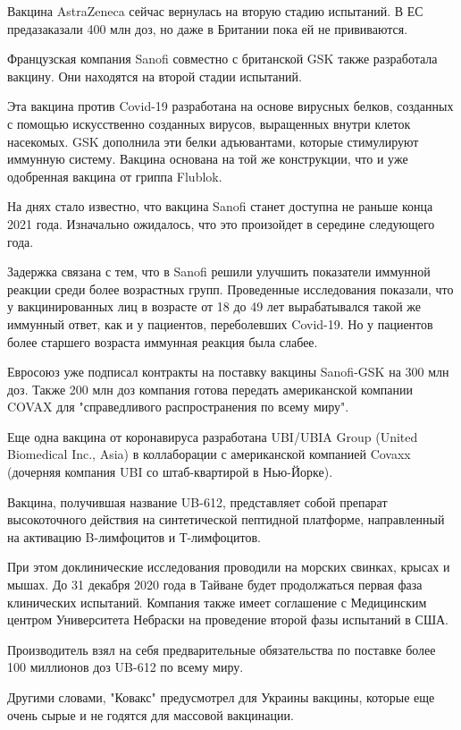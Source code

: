 Вакцина AstraZeneca сейчас вернулась на вторую стадию испытаний. В ЕС
предазаказали 400 млн доз, но даже в Британии пока ей не прививаются.

Французская компания Sanofi совместно с британской GSK также разработала
вакцину. Они находятся на второй стадии испытаний.

Эта вакцина против Covid-19 разработана на основе вирусных белков, созданных с
помощью искусственно созданных вирусов, выращенных внутри клеток насекомых. GSK
дополнила эти белки адъювантами, которые стимулируют иммунную систему. Вакцина
основана на той же конструкции, что и уже одобренная вакцина от гриппа Flublok.

На днях стало известно, что вакцина Sanofi станет доступна не раньше конца 2021
года. Изначально ожидалось, что это произойдет в середине следующего года.

Задержка связана с тем, что в Sanofi решили улучшить показатели иммунной
реакции среди более возрастных групп. Проведенные исследования показали, что у
вакцинированных лиц в возрасте от 18 до 49 лет вырабатывался такой же иммунный
ответ, как и у пациентов, переболевших Covid-19. Но у пациентов более старшего
возраста иммунная реакция была слабее. 

Евросоюз уже подписал контракты на поставку вакцины Sanofi-GSK на 300 млн доз.
Также 200 млн доз компания готова передать американской компании COVAX для
"справедливого распространения по всему миру".

Еще одна вакцина от коронавируса разработана UBI/UBIA Group (United Biomedical
Inc., Asia) в коллаборации с американской компанией Covaxx (дочерняя компания
UBI со штаб-квартирой в Нью-Йорке). 

Вакцина, получившая название UB-612, представляет собой препарат высокоточного
действия на синтетической пептидной платформе, направленный на активацию
B-лимфоцитов и Т-лимфоцитов.

При этом доклинические исследования проводили на морских свинках, крысах и
мышах. До 31 декабря 2020 года в Тайване будет продолжаться первая фаза
клинических испытаний. Компания также имеет соглашение с Медицинским центром
Университета Небраски на проведение второй фазы испытаний в США.

Производитель взял на себя предварительные обязательства по поставке более 100
миллионов доз UB-612 по всему миру.

Другими словами, "Ковакс" предусмотрел для Украины вакцины, которые еще очень
сырые и не годятся для массовой вакцинации.

